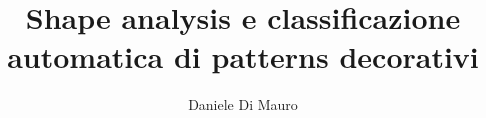 \documentclass[a4paper,12pt]{book}
\begin{document}
\title  {Shape analysis e classificazione automatica di patterns decorativi}
\author  {Daniele Di Mauro}
            

\maketitle




\end{document}
